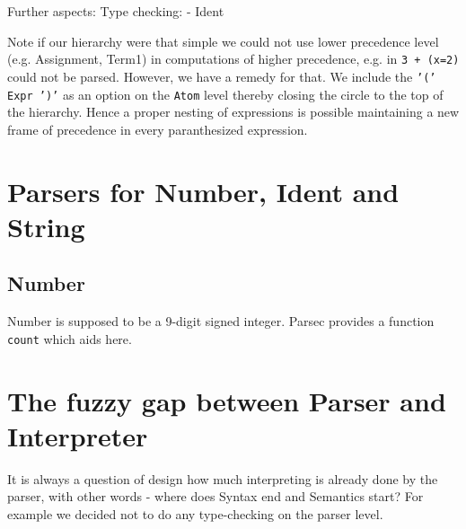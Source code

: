 \documentclass{article}
\begin{document}
Further aspects:
Type checking:
- Ident 

Note if our hierarchy were that simple we could not use lower precedence level (e.g. Assignment, Term1) in computations of higher precedence, e.g. in \texttt{3 + (x=2)}
could not be parsed. However, we have a remedy for that. We include the \texttt{'(' Expr ')'} as an option on the \texttt{Atom} level thereby closing the circle to the top of the
hierarchy. Hence a proper nesting of expressions is possible maintaining a new frame of precedence in every paranthesized expression.


\section{Parsers for Number, Ident and String}

\subsection{Number}
Number is supposed to be a 9-digit signed integer. Parsec provides a function \texttt{count} which aids here.



\section{The fuzzy gap between Parser and Interpreter}
It is always a question of design how much interpreting is already done by the parser, with other words - where does Syntax end and Semantics start?
For example we decided not to do any type-checking on the parser level. %
\end{document}
